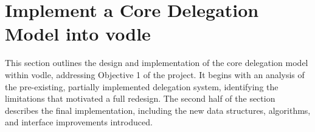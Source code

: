





\section{Implement a Core Delegation Model into vodle}\label{sec:core_delegation_detailed}
This section outlines the design and implementation of the core delegation model within vodle, addressing Objective 1 of the project. It begins with an analysis of the pre-existing, partially implemented delegation system, identifying the limitations that motivated a full redesign. The second half of the section describes the final implementation, including the new data structures, algorithms, and interface improvements introduced.

